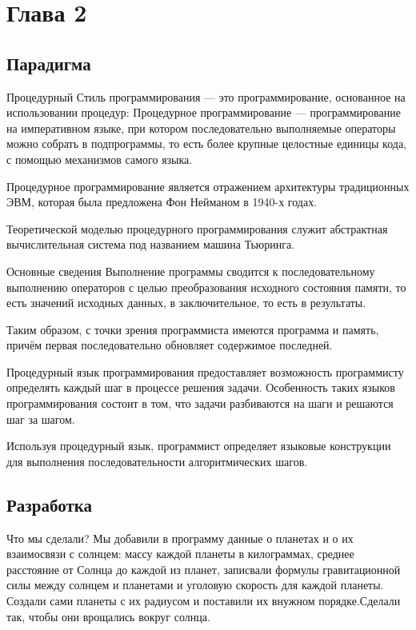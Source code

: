 \documentclass[12pt,a4paper]{extarticle}
\begin{document}
\section{Глава 2}
\subsection{Парадигма}
Процедурный Стиль программирования — это программирование, основанное на использовании процедур:
Процедурное программирование — программирование на императивном языке, при котором последовательно выполняемые операторы можно собрать в подпрограммы, то есть более крупные целостные единицы кода, с помощью механизмов самого языка.

Процедурное программирование является отражением архитектуры традиционных ЭВМ, которая была предложена Фон Нейманом в 1940-х годах.

Теоретической моделью процедурного программирования служит абстрактная вычислительная система под названием машина Тьюринга.

Основные сведения
Выполнение программы сводится к последовательному выполнению операторов с целью преобразования исходного состояния памяти, то есть значений исходных данных, в заключительное, то есть в результаты.

Таким образом, с точки зрения программиста имеются программа и память, причём первая последовательно обновляет содержимое последней.

Процедурный язык программирования предоставляет возможность программисту определять каждый шаг в процессе решения задачи. Особенность таких языков программирования состоит в том, что задачи разбиваются на шаги и решаются шаг за шагом.

Используя процедурный язык, программист определяет языковые конструкции для выполнения последовательности алгоритмических шагов.
\subsection{Разработка}
Что мы сделали? Мы добавили в программу данные о планетах и о их взаимосвязи с солнцем: массу каждой планеты в килограммах, среднее расстояние от Солнца до каждой из планет, записвали формулы гравитационной силы между солнцем и планетами и уголовую скорость для каждой планеты. Создали сами планеты с их радиусом и поставили их внужном порядке.Сделали так, чтобы они врощались вокруг солнца.
\label{sec:longtermgoals}
\end{document}
